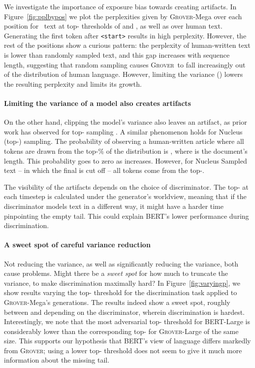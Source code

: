 \documentclass{article}
\newcommand{\modelname}{{\textsc{Grover}}}
\newcommand{\modelnamefordisc}{{\textsc{Grover}}}
\begin{document}
We investigate the importance of exposure bias towards creating artifacts. In Figure~\ref{fig:pplbypos} we plot the perplexities given by \modelname-Mega over each position for \bodyfield~text at top- thresholds of  and , as well as over human text. Generating the first token after {\tt\small <start\bodyfield>} results in high perplexity. However, the rest of the positions show a curious pattern: the perplexity of human-written text is lower than randomly sampled text, and this gap increases with sequence length, suggesting that random sampling causes \modelname~to fall increasingly out of the distribution of human language. However, limiting the variance () lowers the resulting perplexity and limits its growth.

\paragraph{Limiting the variance of a model also creates artifacts}
On the other hand, clipping the model's variance also leaves an artifact, as prior work has observed for top- sampling \citep{strobelt2019gltr}. A similar phenomenon holds for Nucleus (top-) sampling. The probability of observing a human-written article where all tokens are drawn from the top-\% of the distribution is , where  is the document's length. This probability goes to zero as  increases. However, for Nucleus Sampled text -- in which the final  is cut off -- all tokens come from the top-. 

The visibility of the artifacts depends on the choice of discriminator.
The top- at each timestep is calculated under the generator's worldview, meaning that if the discriminator models text in a different way, it might have a harder time pinpointing the empty  tail. This could explain BERT's lower performance during discrimination.

\paragraph{A sweet spot of careful variance reduction}
Not reducing the variance, as well as significantly reducing the variance, both cause problems. Might there be a \emph{sweet spot} for how much to truncate the variance, to make discrimination maximally hard? In Figure~\ref{fig:varyingp}, we show results varying the top- threshold for the discrimination task applied to \modelname-Mega's generations. The results indeed show a sweet spot, roughly between  and  depending on the discriminator, wherein discrimination is hardest. Interestingly, we note that the most adversarial top- threshold for BERT-Large is considerably lower than the corresponding top- for \modelnamefordisc-Large of the same size. This supports our hypothesis that BERT's view of language differs markedly from \modelname; using a lower top- threshold does not seem to give it much more information about the missing tail. 
\end{document}
